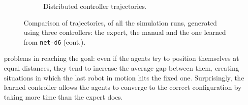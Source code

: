 \begin{figure}[!htb]
\begin{center}
\begin{subfigure}[h]{0.49\textwidth}
		\caption{Distributed controller trajectories.}
	\end{subfigure}
	\end{center}
	\caption[]{Comparison 
	of trajectories, of all the simulation runs, generated using three controllers: the 
	expert, the manual and the one learned from \texttt{net-d6} (cont.).}
	\label{fig:net-d6traj}
\end{figure}

\noindent
problems in reaching the goal: even if the 
agents try to position themselves at equal distances, they tend to increase the 
average gap between them, creating situations in which the last robot in motion 
hits the fixed one. 
Surprisingly, the learned controller allows the agents to converge to the correct 
configuration by taking more time than the expert does.

